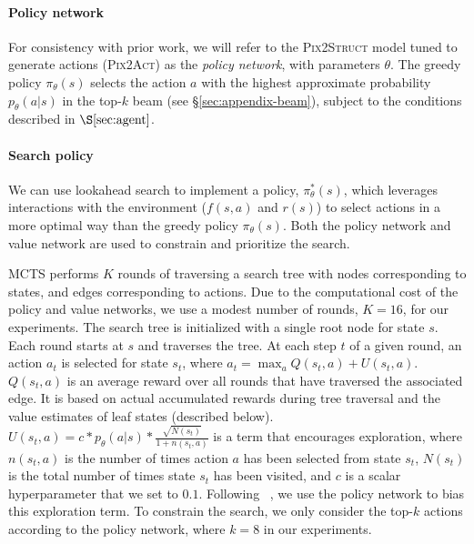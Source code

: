 \paragraph{Policy network} For consistency with prior work, we will refer to the \textsc{Pix2Struct} model tuned to generate actions (\ie \textsc{Pix2Act}) as the \emph{policy network}, with parameters $\theta$. The greedy policy $\pi_\theta(s)$ selects the action $a$ with the highest approximate probability $p_\theta(a|s)$ in the top-$k$ beam (see \S\ref{sec:appendix-beam}), subject to the conditions described in $\S\ref{sec:agent}$.

\paragraph{Search policy} We can use lookahead search to implement a policy, $\pi^*_\theta(s)$, which leverages interactions with the environment ($f(s,a)$ and $r(s)$) to select actions in a more optimal way than the greedy policy $\pi_\theta(s)$. Both the policy network and value network are used to constrain and prioritize the search. 

MCTS performs $K$ rounds of traversing a search tree with nodes corresponding to states, and edges corresponding to actions. 
Due to the computational cost of the policy and value networks, we use a modest number of rounds, $K=16$, for our experiments. The search tree is initialized with a single root node for state $s$. Each round starts at $s$ and traverses the tree. At each step $t$ of a given round, an action $a_t$ is selected for state $s_t$, where $a_t = \max_a Q(s_t,a) + U(s_t,a)$. $Q(s_t,a)$ is an average reward over all rounds that have traversed the associated edge. It is based on actual accumulated rewards during tree traversal and the value estimates of leaf states (described below). $U(s_t,a) = c * p_\theta(a|s) * \frac{\sqrt{N(s_t)}}{1+n(s_t,a)}$ is a term that encourages exploration, where $n(s_t,a)$ is the number of times action $a$ has been selected from state $s_t$, $N(s_t)$ is the total number of times state $s_t$ has been visited, and $c$ is a scalar hyperparameter that we set to $0.1$. 
Following ~\cite{silver2017mastering}, we use the policy network to bias this exploration term. To constrain the search, we only consider the top-$k$ actions according to the policy network, where $k=8$ in our experiments. 

